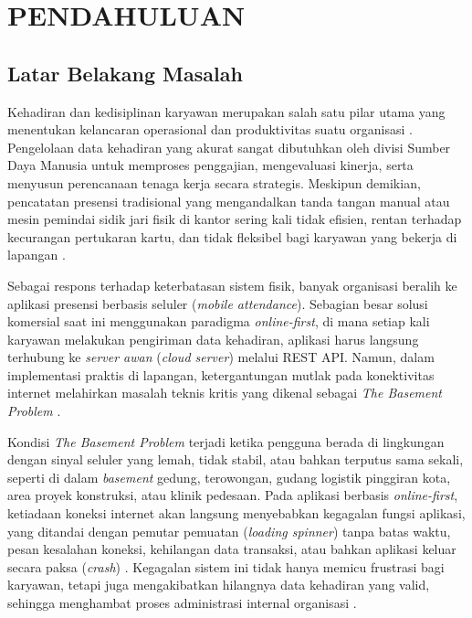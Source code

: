 \chapter{PENDAHULUAN}

\section{Latar Belakang Masalah}
Kehadiran dan kedisiplinan karyawan merupakan salah satu pilar utama yang menentukan kelancaran operasional dan produktivitas suatu organisasi \cite{mekari2024}. Pengelolaan data kehadiran yang akurat sangat dibutuhkan oleh divisi Sumber Daya Manusia untuk memproses penggajian, mengevaluasi kinerja, serta menyusun perencanaan tenaga kerja secara strategis. Meskipun demikian, pencatatan presensi tradisional yang mengandalkan tanda tangan manual atau mesin pemindai sidik jari fisik di kantor sering kali tidak efisien, rentan terhadap kecurangan pertukaran kartu, dan tidak fleksibel bagi karyawan yang bekerja di lapangan \cite{hashmicro2024}.

Sebagai respons terhadap keterbatasan sistem fisik, banyak organisasi beralih ke aplikasi presensi berbasis seluler (\textit{mobile attendance}). Sebagian besar solusi komersial saat ini menggunakan paradigma \textit{online-first}, di mana setiap kali karyawan melakukan pengiriman data kehadiran, aplikasi harus langsung terhubung ke \textit{server awan} (\textit{cloud server}) melalui REST API. Namun, dalam implementasi praktis di lapangan, ketergantungan mutlak pada konektivitas internet melahirkan masalah teknis kritis yang dikenal sebagai \textit{The Basement Problem} \cite{stackademic2024}.

Kondisi \textit{The Basement Problem} terjadi ketika pengguna berada di lingkungan dengan sinyal seluler yang lemah, tidak stabil, atau bahkan terputus sama sekali, seperti di dalam \textit{basement} gedung, terowongan, gudang logistik pinggiran kota, area proyek konstruksi, atau klinik pedesaan. Pada aplikasi berbasis \textit{online-first}, ketiadaan koneksi internet akan langsung menyebabkan kegagalan fungsi aplikasi, yang ditandai dengan pemutar pemuatan (\textit{loading spinner}) tanpa batas waktu, pesan kesalahan koneksi, kehilangan data transaksi, atau bahkan aplikasi keluar secara paksa (\textit{crash}) \cite{smarttechdevs2024}. Kegagalan sistem ini tidak hanya memicu frustrasi bagi karyawan, tetapi juga mengakibatkan hilangnya data kehadiran yang valid, sehingga menghambat proses administrasi internal organisasi \cite{polbeng2024}.

